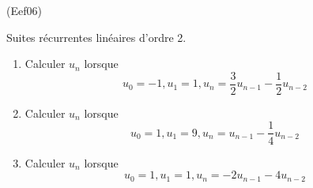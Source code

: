 \begin{tiny}(Eef06)\end{tiny} Suites récurrentes linéaires d'ordre 2.
\begin{enumerate}
  \item Calculer $u_{n}$ lorsque
\begin{displaymath}
u_{0}=-1,u_{1}=1,u_{n}=\frac{3}{2}u_{n-1}-\frac{1}{2}u_{n-2}  
\end{displaymath}

  \item Calculer $u_{n}$ lorsque
\begin{displaymath}
u_{0}=1,u_{1}=9,u_{n}=u_{n-1}-\frac{1}{4}u_{n-2}  
\end{displaymath}

  \item Calculer $u_{n}$ lorsque
\begin{displaymath}
u_{0}=1,u_{1}=1,u_{n}=-2u_{n-1}-4u_{n-2}  
\end{displaymath}
\end{enumerate}
